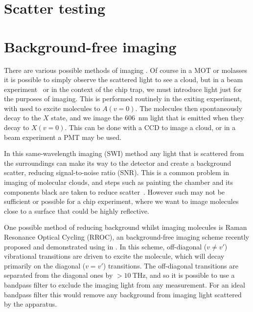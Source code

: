 \section{Scatter testing}


\section{Background-free imaging}


There are various possible methods of imaging \CaF{}. Of course in a MOT or
molasses it is possible to simply observe the scattered light to see a cloud,
but in a beam experiment~\cite{} or in the context of the chip trap, we must
introduce light just for the purposes of imaging. This is performed routinely
in the exiting experiment, with  used to excite molecules to
$A(v=0)$. The molecules then spontaneously decay to the $X$ state, and we image
the \SI{606}{\nano\meter} light that is emitted when they decay to $X(v=0)$.
This can be done with a CCD to image a cloud, or in a beam experiment a PMT
may be used. 

In this same-wavelength imaging (SWI) method any light that is scattered from
the surroundings can make its way to the detector and create a background
scatter, reducing signal-to-noise ratio (SNR). This is a common problem in
imaging of molecular clouds, and steps such as painting the chamber and its
components black are taken to reduce scatter~\cite{}. However such 
may not be sufficient or possible for a chip experiment, where we want to image
molecules close to a surface that could be highly reflective.

One possible method of reducing background whilst imaging molecules is Raman
Resonance Optical Cycling (RROC), an background-free imaging scheme recently
proposed and demonstrated using \SrF{} in . In this scheme,
off-diagonal ($v\neq v'$) vibrational transitions are driven to excite the
molecule, which will decay primarily on the diagonal ($v=v'$) transitions. The
off-diagonal transitions are separated from the diagonal ones by
$>\SI{10}{\tera\hertz}$, and so it is possible to use a bandpass filter to
exclude the imaging light from any measurement. For an ideal bandpass filter
this would remove any background from imaging light scattered by the apparatus.

